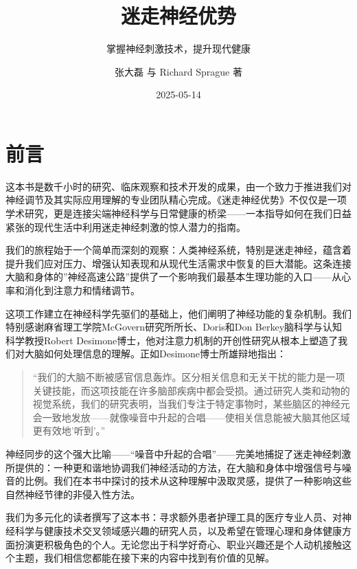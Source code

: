 \documentclass[
  Letterpaper,
]{scrbook}
\title{迷走神经优势}
\subtitle{掌握神经刺激技术，提升现代健康}
\author{张大磊 与 Richard Sprague 著}
\date{2025-05-14}
\renewcommand*\contentsname{目录}
\newcommand\contentsname{目录}
\begin{document}
\frontmatter
\maketitle

\renewcommand*\contentsname{目录}
{
\setcounter{tocdepth}{1}
\tableofcontents
}

\mainmatter
{}

\chapter*{前言}\label{ux524dux8a00}


这本书是数千小时的研究、临床观察和技术开发的成果，由一个致力于推进我们对神经调节及其实际应用理解的专业团队精心完成。《迷走神经优势》不仅仅是一项学术研究，更是连接尖端神经科学与日常健康的桥梁------一本指导如何在我们日益紧张的现代生活中利用迷走神经刺激的惊人潜力的指南。

我们的旅程始于一个简单而深刻的观察：人类神经系统，特别是迷走神经，蕴含着提升我们应对压力、增强认知表现和从现代生活需求中恢复的巨大潜能。这条连接大脑和身体的''神经高速公路''提供了一个影响我们最基本生理功能的入口------从心率和消化到注意力和情绪调节。

这项工作建立在神经科学先驱们的基础上，他们阐明了神经功能的复杂机制。我们特别感谢麻省理工学院McGovern研究所所长、Doris和Don
Berkey脑科学与认知科学教授Robert
Desimone博士，他对注意力机制的开创性研究从根本上塑造了我们对大脑如何处理信息的理解。正如Desimone博士所雄辩地指出：

\begin{quote}
``我们的大脑不断被感官信息轰炸。区分相关信息和无关干扰的能力是一项关键技能，而这项技能在许多脑部疾病中都会受损。通过研究人类和动物的视觉系统，我们的研究表明，当我们专注于特定事物时，某些脑区的神经元会一致地发放------就像噪音中升起的合唱------使相关信息能被大脑其他区域更有效地'听到'。''
\end{quote}

神经同步的这个强大比喻------``噪音中升起的合唱''------完美地捕捉了迷走神经刺激所提供的：一种更和谐地协调我们神经活动的方法，在大脑和身体中增强信号与噪音的比例。我们在本书中探讨的技术从这种理解中汲取灵感，提供了一种影响这些自然神经节律的非侵入性方法。

我们为多元化的读者撰写了这本书：寻求额外患者护理工具的医疗专业人员、对神经科学与健康技术交叉领域感兴趣的研究人员，以及希望在管理心理和身体健康方面扮演更积极角色的个人。无论您出于科学好奇心、职业兴趣还是个人动机接触这个主题，我们相信您都能在接下来的内容中找到有价值的见解。
\end{document}
